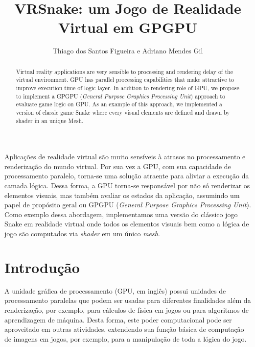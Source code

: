 \documentclass{SBCbookchapter}
\author{Thiago dos Santos Figueira e Adriano Mendes Gil}
\title{VRSnake: um Jogo de Realidade Virtual em GPGPU}
\begin{document}
\maketitle

\begin{abstract}
 Virtual reality applications are very sensible to processing and rendering delay of the virtual environment. GPU has parallel processing capabilities that make attractive to improve execution time of logic layer. In addition to rendering role of GPU, we propose to implement a GPGPU (\textit{General Purpose Graphics Processing Unit}) approach to evaluate game logic on GPU. As an example of this approach, we implemented a version of classic game Snake where every visual elements are defined and drawn by shader in an unique Mesh.
\end{abstract}

\begin{resumo}
\begin{otherlanguage}{brazilian}
Aplicações de realidade virtual são muito sensíveis à atrasos no processamento e renderização do mundo virtual.
Por sua vez a GPU, com sua capacidade de processamento paralelo, torna-se uma solução atraente para aliviar a execução da camada lógica. Dessa forma, a GPU torna-se responsável por não só renderizar os elementos visuais, mas também avaliar os estados da aplicação, assumindo um papel de propósito geral ou GPGPU (\textit{General Purpose Graphics Processing Unit}). Como exemplo dessa abordagem, implementamos uma versão do clássico jogo Snake em realidade virtual onde todos os elementos visuais bem como a lógica de jogo são computados via \textit{shader} em um único \textit{mesh}.
\end{otherlanguage}
\end{resumo}

\section{Introdução} \label{sec:introduction}

A unidade gráfica de processamento (GPU, em inglês) possui unidades de processamento paralelas \cite{DBLP:journals/corr/abs-1202-4347} que podem ser usadas para diferentes finalidades além da renderização, por exemplo, para cálculos de física em jogos ou para algoritmos de aprendizagem de máquina. Desta forma, este poder computacional pode ser aproveitado em outras atividades, extendendo sua função básica de computação de imagens em jogos, por exemplo, para a manipulação de toda a lógica do jogo.
\end{document}

